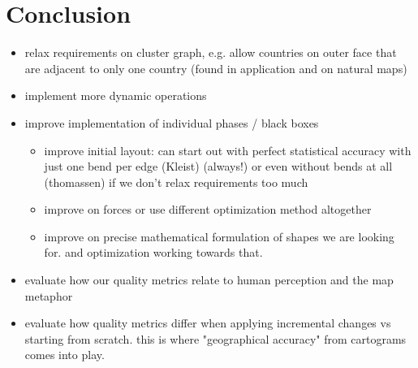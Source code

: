 \chapter{Conclusion}
\label{chap:conclusion}

\begin{itemize}
	\item relax requirements on cluster graph, e.g. allow countries on outer face that are adjacent to only one country (found in application and on natural maps)
	\item implement more dynamic operations
	\item improve implementation of individual phases / black boxes \begin{itemize}
		\item improve initial layout: can start out with perfect statistical accuracy with just one bend per edge (Kleist) (always!) or even without bends at all (thomassen) if we don't relax requirements too much
		\item improve on forces or use different optimization method altogether
		\item improve on precise mathematical formulation of shapes we are looking for. and optimization working towards that.
	\end{itemize}
	\item evaluate how our quality metrics relate to human perception and the map metaphor
	\item evaluate how quality metrics differ when applying incremental changes vs starting from scratch. this is where "geographical accuracy" from cartograms comes into play.
\end{itemize}
